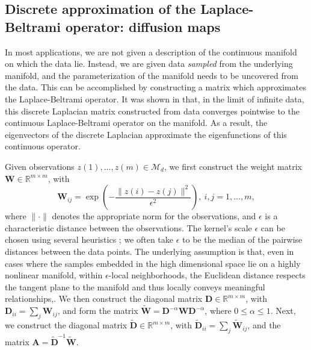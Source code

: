 \documentclass[3p]{elsarticle}
\begin{document}
\subsection{Discrete approximation of the Laplace-Beltrami operator: diffusion maps}

In most applications, we are not given a description of the continuous manifold on which the data lie.
%
Instead, we are given data {\em sampled} from the underlying manifold,
and the parameterization of the manifold needs to be uncovered from the data.
%
This can be accomplished by constructing a matrix which approximates the Laplace-Beltrami operator.
%
It was shown in \cite{coifman2006geometric} that, in the limit of infinite data,
this discrete Laplacian matrix constructed from data converges pointwise to the continuous Laplace-Beltrami operator on the manifold.
%
As a result, the eigenvectors of the discrete Laplacian approximate the eigenfunctions of this continuous operator.

Given observations $z(1), \dots, z(m) \in \mathcal{M}_d$, we first construct the weight matrix $\mathbf{W} \in \mathbb{R}^{m \times m}$, with
\begin{equation} \label{eq:W}
\mathbf{W}_{ij} = \exp \left( -\frac{\|z(i) - z(j) \|^2}{\epsilon^2} \right), \ i,j=1,\ldots,m,
\end{equation}
where $\| \cdot \|$ denotes the appropriate norm for the observations, and $\epsilon$ is a characteristic distance between the observations.
%
The kernel's scale $\epsilon$ can be chosen using several heuristics \cite{rohrdanz2011determination, coifman2008graph};
we often take $\epsilon$ to be the median of the pairwise distances between the data points. 
%
The underlying assumption is that, even in cases where the samples embedded in the high dimensional space lie on a highly nonlinear manifold, within $\epsilon$-local neighborhoods, the Euclidean distance respects the tangent plane to the manifold and thus locally conveys meaningful relationships,. 
%
We then construct the diagonal matrix $\mathbf{D} \in \mathbb{R}^{m \times m}$, with $\mathbf{D}_{ii} = \sum_j \mathbf{W}_{ij}$,
and form the matrix $\widetilde{\mathbf{W}} = \mathbf{D}^{-\alpha} \mathbf{W} \mathbf{D}^{-\alpha}$, where $0 \le \alpha \le 1$.
%
Next, we construct the diagonal matrix $\widetilde{\mathbf{D}} \in \mathbb{R}^{m \times m}$, with $\widetilde{\mathbf{D}}_{ii} = \sum_j \widetilde{\mathbf{W}}_{ij}$, and the matrix $\mathbf{A}  = \widetilde{\mathbf{D}}^{-1} \widetilde{\mathbf{W}}.$
\end{document}
